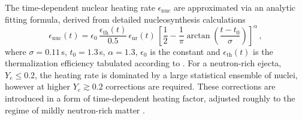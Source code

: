 
The time-dependent nuclear heating rate $\epsilon_{\text{nuc}}$ 
are approximated via an analytic fitting formula, derived from detailed 
nucleosynthesis calculations~\citep{Korobkin:2012uy}  
%
\begin{equation}
\label{eq:kilonova:eps_korob}
\epsilon_{\text{nuc}}(t)= \epsilon_0 \, \frac{\epsilon_{\text{th}}(t)}{0.5} \, \epsilon_{\text{nr}}(t) \,
\left[ \frac{1}{2} - \frac{1}{\pi} \arctan\left(\frac{t-t_0}{\sigma}\right)\right]^{\alpha}\,,
\end{equation}
%
where $\sigma = 0.11\,$s, $t_0 = 1.3\,$s, $\alpha=1.3$,
$\epsilon_0$ is the constant and 
$\epsilon_{\text{th}}(t)$ is the 
thermalization efficiency tabulated according to \citet{Barnes:2016umi}.
%
For a neutron-rich ejecta, $Y_e\leq 0.2$, the heating rate is dominated by a large statistical 
ensemble of nuclei, however at higher $Y_e\gtrsim 0.2$ corrections are required. 
%
These corrections are introduced in a form of time-dependent heating factor, adjusted 
roughly to the regime of mildly neutron-rich matter \citep{Perego:2017wtu}.

%

